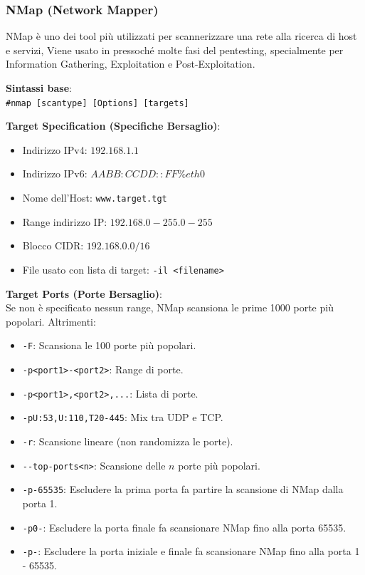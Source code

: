 \documentclass{article}
\begin{document}
\subsubsection{NMap (Network Mapper)}
NMap è uno dei tool più utilizzati per scannerizzare una rete alla ricerca di host e servizi, Viene usato in pressoché molte fasi del pentesting, specialmente per Information Gathering, Exploitation e Post-Exploitation.

\textbf{Sintassi base}:\\
\verb|#nmap [scantype] [Options] [targets]|

\textbf{Target Specification (Specifiche Bersaglio)}:
\begin{itemize}
    \item Indirizzo IPv4: $192.168.1.1$
    \item Indirizzo IPv6: $AABB:CCDD::FF\%eth0$
    \item Nome dell'Host: \verb|www.target.tgt|
    \item Range indirizzo IP: $192.168.0-255.0-255$
    \item Blocco CIDR: $192.168.0.0/16$
    \item File usato con lista di target: \verb|-il <filename>|
\end{itemize}

\textbf{Target Ports (Porte Bersaglio)}:\\
Se non è specificato nessun range, NMap scansiona le prime 1000 porte più popolari. Altrimenti: 
\begin{itemize}
    \item \verb|-F|: Scansiona le 100 porte più popolari.
    \item \verb|-p<port1>-<port2>|: Range di porte.
    \item \verb|-p<port1>,<port2>,...|: Lista di porte.
    \item \verb|-pU:53,U:110,T20-445|: Mix tra UDP e TCP.
    \item \verb|-r|: Scansione lineare (non randomizza le porte).
    \item \verb|--top-ports<n>|: Scansione delle $n$ porte più popolari.
    \item \verb|-p-65535|: Escludere la prima porta fa partire la scansione di NMap dalla porta 1.
    \item \verb|-p0-|: Escludere la porta finale fa scansionare NMap fino alla porta 65535.
    \item \verb|-p-|: Escludere la porta iniziale e finale fa scansionare NMap fino alla porta 1 - 65535.
\end{itemize}
\end{document}
